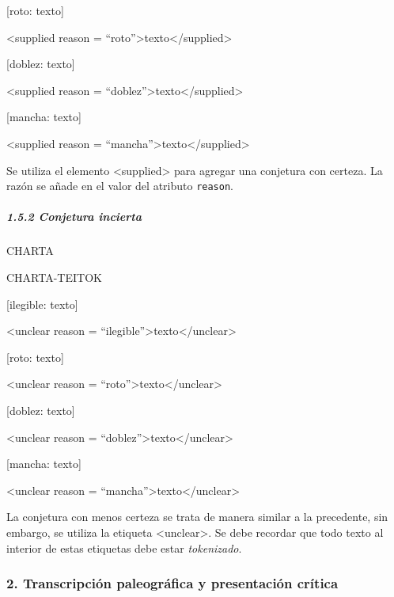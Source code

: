 \documentclass[
]{book}
\begin{document}
{[}roto: texto{]}

{\textless supplied} {reason} {=} {``roto''}{\textgreater{}}texto{\textless/supplied\textgreater{}}

{[}doblez: texto{]}

{\textless supplied} {reason} {=} {``doblez''}{\textgreater{}}texto{\textless/supplied\textgreater{}}

{[}mancha: texto{]}

{\textless supplied} {reason} {=} {``mancha''}{\textgreater{}}texto{\textless/supplied\textgreater{}}

Se utiliza el elemento { \textless supplied\textgreater{}} para agregar una conjetura con certeza. La razón se añade en el valor del atributo \texttt{reason}.

\hypertarget{conjetura-incierta}{%
\subparagraph*{1.5.2 Conjetura incierta}\label{conjetura-incierta}}

CHARTA

CHARTA-TEITOK

{[}ilegible: texto{]}

{\textless unclear} {reason} {=} {``ilegible''}{\textgreater{}}texto{\textless/unclear\textgreater{}}

{[}roto: texto{]}

{\textless unclear} {reason} {=} {``roto''}{\textgreater{}}texto{\textless/unclear\textgreater{}}

{[}doblez: texto{]}

{\textless unclear} {reason} {=} {``doblez''}{\textgreater{}}texto{\textless/unclear\textgreater{}}

{[}mancha: texto{]}

{\textless unclear} {reason} {=} {``mancha''}{\textgreater{}}texto{\textless/unclear\textgreater{}}

La conjetura con menos certeza se trata de manera similar a la precedente, sin embargo, se utiliza la etiqueta { \textless unclear\textgreater{}}. Se debe recordar que todo texto al interior de estas etiquetas debe estar \emph{tokenizado}.

\hypertarget{transcripciuxf3n-paleogruxe1fica-y-presentaciuxf3n-cruxedtica}{%
\subsubsection*{2. Transcripción paleográfica y presentación crítica}\label{transcripciuxf3n-paleogruxe1fica-y-presentaciuxf3n-cruxedtica}}
\end{document}
